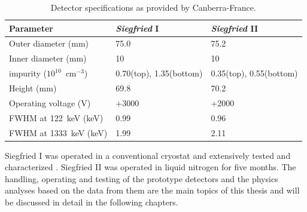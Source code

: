 \begin{table}[tbhp]
\centering
\caption{Detector specifications as provided by Canberra-France.}
\label{tab:tt:detpar}
\begin{tabular}{lll}\\\hline
Parameter & \emph{Siegfried} I  & \emph{Siegfried} II \\\hline
Outer diameter (mm)   & 75.0 & 75.2\\ 
Inner diameter (mm)   & 10 & 10 \\ 
impurity ($10^{10}$~cm$^{-3}$) & 0.70(top), 1.35(bottom) & 0.35(top), 0.55(bottom) \\
Height (mm)           & 69.8 & 70.2 \\\hline 
Operating voltage (V) & +3000 & +2000 \\ 
FWHM at 122~keV (keV)  & 0.99 & 0.96 \\ 
FWHM at 1333~keV (keV) & 1.99 & 2.11 \\ \hline 
\end{tabular}
\end{table}

Siegfried I was operated in a conventional cryostat and extensively tested and characterized \cite{Sie07}. Siegfried II was operated in liquid nitrogen for five months. The handling, operating and testing of the prototype detectors and the physics analyses based on the data from them are the main topics of this thesis and will be discussed in detail in the following chapters.

